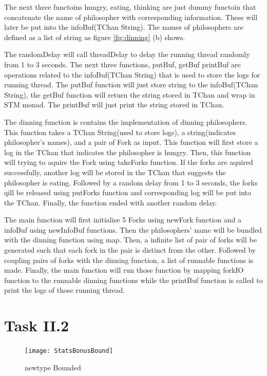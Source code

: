 \documentclass{article}
\begin{document}
\begin{normalsize}
  The next three functoins hungry, eating, thinking are just dummy functoin that
  concatenate the name of philosopher with corresponding information. These will
  later be put into the infoBuf(TChan String). The names of philosophers are
  defined as a list of string as figure \ref{fig:dinning} (b) shows.

  The randomDelay will call threadDelay to delay the running thread randomly
  from 1 to 3 seconds. The next three functions, putBuf, getBuf printBuf are
  operations related to the infoBuf(TChan String) that is used to store the logs
  for running thread. The putBuf function will just store string to the
  infoBuf(TChan String), the getBuf function will return the string stored in
  TChan and wrap in STM monad. The printBuf will just print the string stored in
  TChan.

  The dinning function is contains the implementation of dinning philosophers.
  This function takes a TChan String(used to store logs), a string(indicates
  philosopher's names), and a pair of Fork as input. This function will first
  store a log in the TChan that indicates the philosopher is hungry. Then, this
  function will trying to aquire the Fork using takeForks function. If the
  forks are aquired successfully, another log will be stored in the TChan that
  suggests the philosopher is eating. Followed by a random delay from 1 to 3
  seconds, the forks qill be released using putForks function and corresponding
  log will be put into the TChan. Finally, the function ended with another
  random delay.

  The main function will first initialise 5 Forks using newFork function and a
  infoBuf using newInfoBuf functions. Then the philosophers' name will be
  bundled with the dinning function using map. Then, a infinite list of pair of
  forks will be generated such that each fork in the pair is distinct from the
  other. Followed by coupling pairs of forks with the dinning function, a list
  of runnable functions is made. Finally, the main function will run those
  function by mapping forkIO function to the runnable dinning functions while
  the printBuf function is called to print the logs of those running thread.

  


  \section{Task II.2}
  
  \begin{figure}[H]
    \centering
    \centerline{\texttt{[image: StatsBonusBound]}}
    \caption{newtype Bounded}
    \label{fig:bounded}
  \end{figure}


\end{normalsize}
\end{document}

